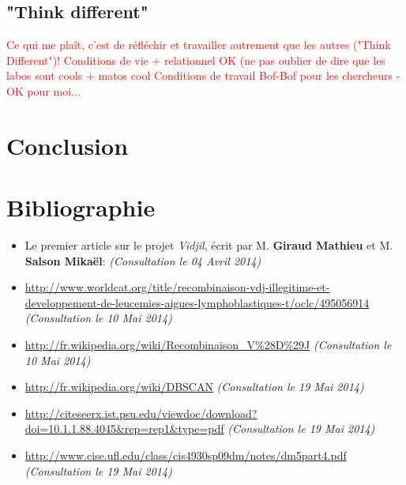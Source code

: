 \documentclass{report}
\begin{document}
\section{"Think different"}

\textcolor{red}{Ce qui me plaît, c'est de réfléchir et travailler autrement que les autres ("Think Different")!
\newline
Conditions de vie + relationnel OK (ne pas oublier de dire que les labos sont cools + matos cool
\newline
Conditions de travail Bof-Bof pour les chercheurs - OK pour moi...}

\chapter{Conclusion}


\chapter{Bibliographie}
\begin{itemize}
\item{Le premier article sur le projet \textit{Vidjil}, écrit par M. \textbf{Giraud Mathieu} et M. \textbf{Salson Mikaël}: \url{} \textit{(Consultation le 04 Avril 2014)}}
\item{\url{http://www.worldcat.org/title/recombinaison-vdj-illegitime-et-developpement-de-leucemies-aigues-lymphoblastiques-t/oclc/495056914} \textit{(Consultation le 10 Mai 2014)}}
\item{\url{http://fr.wikipedia.org/wiki/Recombinaison_V%28D%29J} \textit{(Consultation le 10 Mai 2014)}}
\item{\url{http://fr.wikipedia.org/wiki/DBSCAN} \textit{(Consultation le 19 Mai 2014)}}
\item{\url{http://citeseerx.ist.psu.edu/viewdoc/download?doi=10.1.1.88.4045&rep=rep1&type=pdf} \textit{(Consultation le 19 Mai 2014)}}
\item{\url{http://www.cise.ufl.edu/class/cis4930sp09dm/notes/dm5part4.pdf} \textit{(Consultation le 19 Mai 2014)}}
\end{itemize}
\end{document}
